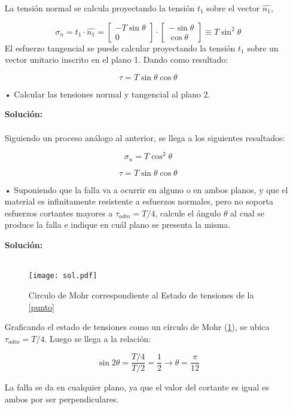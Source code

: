 \documentclass[../notas medios.tex]{subfiles}
\begin{document}
\begin{itemize}
La tensión normal se calcula proyectando la tensión $t_1$ sobre el vector $\hat{n_1}$, 

\begin{equation*}
\sigma_n = 
t_1 \cdot \hat{n_1} = 
\begin{bmatrix}
    -T\sin{\theta} \\
    0 
\end{bmatrix} \cdot
\begin{bmatrix}
    -\sin{\theta} \\
    \cos{\theta} 
\end{bmatrix} \equiv
T\sin^2\theta
\end{equation*}
%
El esfuerzo tangencial se puede calcular proyectando la tensión $t_1$ sobre un vector unitario inscrito en el plano 1. Dando como resultado:

\begin{equation*}
\tau = T\sin{\theta}\cos{\theta} 
\end{equation*}

\item[•] Calcular las tensiones normal y tangencial al plano 2.

\textbf{Solución:}\\\\

Siguiendo un proceso análogo al anterior, se llega a los siguientes resultados:

\begin{equation*}
\sigma_n = T\cos^2\theta 
\end{equation*}

\begin{equation*}
\tau = T\sin{\theta}\cos{\theta}
\end{equation*}

\item[•] Suponiendo que la falla va a ocurrir en alguno o en ambos planos, y que el material es infinitamente resistente a esfuerzos normales, pero no soporta esfuerzos cortantes mayores a $\tau_{adm} = T/4$, calcule el ángulo $\theta$ al cual se produce la falla e indique en cuál plano se presenta la misma. 

\textbf{Solución:}\\\\

\begin{figure}[h]
	\centering
	\texttt{[image: sol.pdf]} 
	\caption{Circulo de Mohr correspondiente al Estado de tensiones de la \cref{punto}}
	\label{sol}
\end{figure}

Graficando el estado de tensiones como un círculo de Mohr (\cref{sol}), se ubica $\tau_{adm} = T/4$. Luego se llega a la relación:

\begin{equation*}
\sin{2\theta} = \frac{T/4}{T/2} = \frac{1}{2} \rightarrow
\theta = \frac{\pi}{12}
\end{equation*}

La falla se da en cualquier plano, ya que el valor del cortante es igual es ambos por ser perpendiculares.

\end{itemize}
\end{document}

